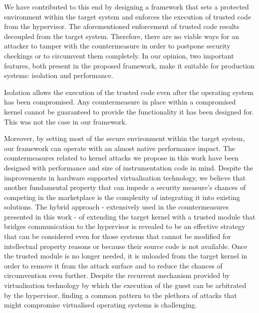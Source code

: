 We have contributed to this end by designing a framework that sets a protected environment within the target system and enforces the execution of trusted code from the hypervisor. The aforementioned enforcement of trusted code results decoupled from the target system. Therefore, there are no viable ways for an attacker to tamper with the countermeasure in order to postpone security checkings or to circumvent them completely. In our opinion, two important features, both present in the proposed framework, make it suitable for production systems: isolation and performance.

Isolation allows the execution of the trusted code even after the operating system has been compromised. Any countermeasure in place within a compromised kernel cannot be guaranteed to provide the functionality it has been designed for. This was not the case in our framework.  

Moreover, by setting most of the secure environment within the target system, our framework can operate with an almost native performance impact. 
The countermeasures related to kernel attacks we propose in this work have been designed with performance and size of instrumentation code in mind. Despite the improvements in hardware supported virtualisation technology, we believe that another fundamental property that can impede a security measure's chances of competing in the marketplace is the complexity of integrating it into existing solutions.
The hybrid approach - extensively used in the countermeasures presented in this work - of extending the target kernel with a trusted module that bridges communication to the hypervisor is revealed to be an effective strategy that can be considered even for those systems that cannot be modified for intellectual property reasons or because their source code is not available. Once the trusted module is no longer needed, it is unloaded from the target kernel in order to remove it from the attack surface and to reduce the chances of circumvention even further.
Despite the recurrent mechanism provided by virtualisation technology by which the execution of the guest can be arbitrated by the hypervisor, finding a common pattern to the plethora of attacks that might compromise virtualised operating systems is challenging.

